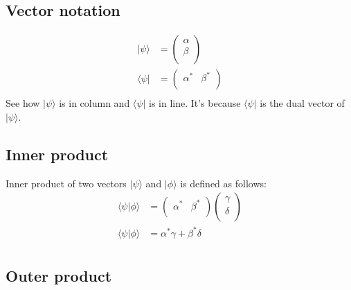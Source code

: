 \documentclass{article}
\begin{document}
\subsection{Vector notation}

\begin{equation}
    \begin{split}
        |\psi\rangle & = \begin{pmatrix}
            \alpha \\
            \beta \\
        \end{pmatrix} \\
        \langle\psi| & = \begin{pmatrix}
            \alpha^* & \beta^* \\
        \end{pmatrix} \\
    \end{split}
\end{equation}
See how $|\psi\rangle$ is in column and $\langle\psi|$ is in line. It's because
$\langle\psi|$ is the dual vector of $|\psi\rangle$.

\subsection{Inner product}

Inner product of two vectors $|\psi\rangle$ and $|\phi\rangle$ is defined as follows:
\begin{equation}
    \begin{split}
        \langle\psi|\phi\rangle & = \begin{pmatrix}
            \alpha^* & \beta^* \\
        \end{pmatrix} \begin{pmatrix}
            \gamma \\
            \delta \\
        \end{pmatrix} \\
        \langle\psi|\phi\rangle & = \alpha^*\gamma + \beta^*\delta \\
    \end{split}
\end{equation}

\subsection{Outer product}
\end{document}
